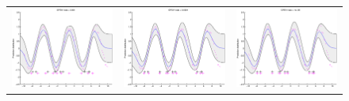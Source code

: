 \documentclass{article} %
\begin{document}
\begin{figure}
\centering
\begin{tabular}{ccc}
\includegraphics[scale=0.3]{figures/func2-svi-lrate1e-03.eps} &
\includegraphics[scale=0.3]{figures/func2-svi-lrate1e-04.eps} &
\includegraphics[scale=0.3]{figures/func2-svi-lrate1e-05.eps} \\

\end{tabular}
\end{figure}
\end{document}
